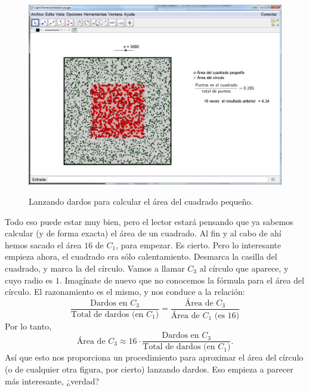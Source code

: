 \documentclass[10pt,a4paper]{article}\usepackage[]{graphicx}\usepackage[]{color}
\begin{document}
\begin{figure}[htbp]
    \begin{center}
    \includegraphics[width=15cm]{../fig/Tut03-45.png}\\[3mm]
    \end{center}
  \caption{Lanzando dardos para calcular el área del cuadrado pequeño.}
  \label{tut03:fig:MontecarloAreaCirculo02}
\end{figure}
Todo eso puede estar muy bien, pero el lector estará pensando que ya sabemos calcular (y de forma exacta) el área de un cuadrado. Al fin y al cabo de ahí hemos sacado el área  $16$ de $C_1$, para empezar. Es cierto. Pero lo interesante empieza ahora, el cuadrado era sólo calentamiento. Desmarca la casilla del cuadrado, y marca la del círculo. Vamos a llamar $C_3$ al círculo que aparece, y cuyo radio es $1$. Imagínate de nuevo que no conocemos la fórmula para el área del círculo.   El razonamiento es el mismo, y nos conduce a la relación:
\[
\dfrac{\mbox{Dardos en $C_3$}}{\mbox{Total de dardos (en $C_1$)}} =
\dfrac{\mbox{Área de $C_3$}}{\mbox{Área de $C_1$ (es 16)}}
\]
Por lo tanto,
\[
\mbox{Área de $C_3$}\approx 16\cdot \dfrac{\mbox{Dardos en $C_3$}}{\mbox{Total de dardos (en $C_1$)}}.
\]
Así que esto nos proporciona un procedimiento para aproximar el área del círculo (o de cualquier otra figura, por cierto) lanzando dardos. Eso empieza a parecer más interesante, ¿verdad?
\end{document}

